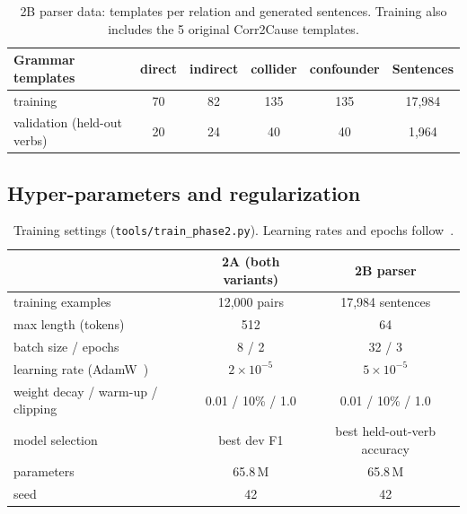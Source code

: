 \documentclass[12pt,a4paper]{article}
\newcommand{\thead}[1]{\textbf{#1}}
\newcommand{\code}[1]{\texttt{#1}}
\begin{document}
\begin{table}[!htbp]
\centering\small
\caption{2B parser data: templates per relation and generated sentences. Training also includes the 5 original
Corr2Cause templates.}
\label{tab:parserdata}
\begin{tabular}{@{}lccccc@{}}
\toprule
\thead{Grammar templates} & \thead{direct} & \thead{indirect} & \thead{collider} & \thead{confounder} & \thead{Sentences} \\
\midrule
training & 70 & 82 & 135 & 135 & 17{,}984 \\
\rowcolor{rowtint} validation (held-out verbs) & 20 & 24 & 40 & 40 & 1{,}964 \\
\bottomrule
\end{tabular}
\end{table}

\subsection{Hyper-parameters and regularization}

\begin{table}[!htbp]
\centering\small
\caption{Training settings (\code{tools/train\_phase2.py}). Learning rates and epochs follow~\cite{devlin2019,sun2019}.}
\label{tab:hparams}
\begin{tabular}{@{}lcc@{}}
\toprule
& \thead{2A (both variants)} & \thead{2B parser} \\
\midrule
training examples & 12{,}000 pairs & 17{,}984 sentences \\
\rowcolor{rowtint} max length (tokens) & 512 & 64 \\
batch size / epochs & 8 / 2 & 32 / 3 \\
\rowcolor{rowtint} learning rate (AdamW~\cite{loshchilov2019}) & $2\times10^{-5}$ & $5\times10^{-5}$ \\
weight decay / warm-up / clipping & 0.01 / 10\% / 1.0 & 0.01 / 10\% / 1.0 \\
\rowcolor{rowtint} model selection & best dev F1 & best held-out-verb accuracy \\
parameters & 65.8\,M & 65.8\,M \\
\rowcolor{rowtint} seed & 42 & 42 \\
\bottomrule
\end{tabular}
\end{table}
\end{document}
